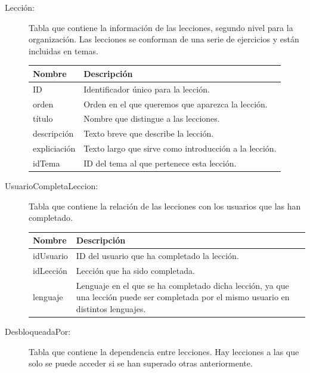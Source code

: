 \begin{description}
\item[Lección:] Tabla que contiene la información de las lecciones, segundo nivel para la organización. Las lecciones se conforman de una serie de ejercicios y están incluidas en temas.

\begin{tabularx}{14cm}{|l|X|}
\hline
\textbf{Nombre} & \textbf{Descripción}                                                              \\ \hline
ID              & Identificador único para la lección.                                         \\ \hline
orden        & Orden en el que queremos que aparezca la lección. \\ \hline
título      & Nombre que distingue a las lecciones. \\ \hline
descripción              & Texto breve que describe la lección.                                         \\ \hline
expliciación        & Texto largo que sirve como introducción a la lección.  \\ \hline
idTema      & ID del tema al que pertenece esta lección. \\ \hline
\end{tabularx}
\vspace{1em}

\item[UsuarioCompletaLeccion:] Tabla que contiene la relación de las lecciones con los usuarios que las han completado.

\begin{tabularx}{14cm}{|l|X|}
\hline
\textbf{Nombre} & \textbf{Descripción}                                                              \\ \hline
idUsuario       & ID del usuario que ha completado la lección.                                                          \\ \hline
idLección     & Lección que ha sido completada.                                           \\ \hline
lenguaje            & Lenguaje en el que se ha completado dicha lección, ya que una lección puede ser completada por el mismo usuario en distintos lenguajes. \\ \hline
\end{tabularx}
\vspace{1em}

\item[DesbloqueadaPor:] Tabla que contiene la dependencia entre lecciones. Hay lecciones a las que solo se puede acceder si se han superado otras anteriormente.


\end{description}
